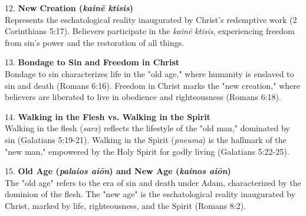 \documentclass{article}
\begin{document}
12. \textbf{New Creation (\textit{kainē ktisis})} \\
   \hspace*{0.5cm} Represents the eschatological reality inaugurated by Christ's redemptive work (2 Corinthians 5:17). Believers participate in the \textit{kainē ktisis}, experiencing freedom from sin's power and the restoration of all things.

13. \textbf{Bondage to Sin and Freedom in Christ} \\
   \hspace*{0.5cm} Bondage to sin characterizes life in the "old age," where humanity is enslaved to sin and death (Romans 6:16). Freedom in Christ marks the "new creation," where believers are liberated to live in obedience and righteousness (Romans 6:18).

14. \textbf{Walking in the Flesh vs. Walking in the Spirit} \\
   \hspace*{0.5cm} Walking in the flesh (\textit{sarx}) reflects the lifestyle of the "old man," dominated by sin (Galatians 5:19-21). Walking in the Spirit (\textit{pneuma}) is the hallmark of the "new man," empowered by the Holy Spirit for godly living (Galatians 5:22-25).

15. \textbf{Old Age (\textit{palaios aiōn}) and New Age (\textit{kainos aiōn})} \\
   \hspace*{0.5cm} The "old age" refers to the era of sin and death under Adam, characterized by the dominion of the flesh. The "new age" is the eschatological reality inaugurated by Christ, marked by life, righteousness, and the Spirit (Romans 8:2).
\end{document}
